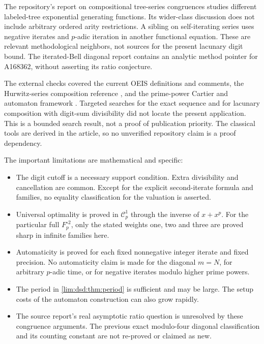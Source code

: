 \documentclass[11pt]{article}
\theoremstyle{definition}
\theoremstyle{remark}
\newcommand{\Cp}{\mathcal C_p}
\begin{document}
The repository's report on compositional tree-series congruences
studies different labeled-tree exponential generating functions.
Its wider-class discussion does not include arbitrary ordered
arity restrictions. A sibling on self-iterating series uses
negative iterates and $p$-adic iteration in another functional
equation. These are relevant methodological neighbors, not
sources for the present lacunary digit bound. The iterated-Bell
diagonal report contains an analytic method pointer for A168362,
without asserting its ratio conjecture.

The external checks covered the current OEIS definitions and
comments, the Hurwitz-series composition reference \cite{dsdBCM},
and the prime-power Cartier and automaton framework \cite{dsdRY}.
Targeted searches for the exact sequence and for lacunary
composition with digit-sum divisibility did not locate the
present application. This is a bounded search result, not a
proof of publication priority. The classical tools are derived
in the article, so no unverified repository claim is a proof
dependency.

The important limitations are mathematical and specific:
\begin{itemize}
\item The digit cutoff is a necessary support condition. Extra
divisibility and cancellation are common. Except for the explicit
second-iterate formula and families, no equality classification
for the valuation is asserted.
\item Universal optimality is proved in $\Cp^1$ through the inverse
of $x+x^p$. For the particular full $F_p^{\circ2}$, only the
stated weights one, two and three are proved sharp in infinite
families here.
\item Automaticity is proved for each fixed nonnegative integer
iterate and fixed precision. No automaticity claim is made for
the diagonal $m=N$, for arbitrary $p$-adic time, or for negative
iterates modulo higher prime powers.
\item The period in \cref{lim:dsd:thm:period} is sufficient and may be
large. The setup costs of the automaton construction can also
grow rapidly.
\item The source report's real asymptotic ratio question is
unresolved by these congruence arguments. The previous exact
modulo-four diagonal classification and its counting constant
are not re-proved or claimed as new.
\end{itemize}
\end{document}
